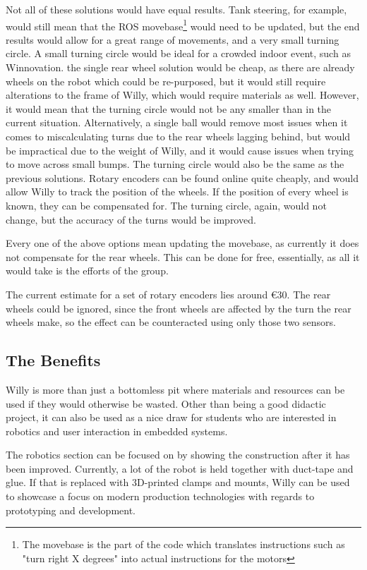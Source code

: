 Not all of these solutions would have equal results.
Tank steering, for example, would still mean that the ROS movebase\footnote{The movebase is the part of the code which translates instructions such as "turn right X degrees" into actual instructions for the motors} would need to be updated, but the end results would allow for a great range of movements, and a very small turning circle.
A small turning circle would be ideal for a crowded indoor event, such as Winnovation.
the single rear wheel solution would be cheap, as there are already wheels on the robot which could be re-purposed, but it would still require alterations to the frame of Willy, which would require materials as well.
However, it would mean that the turning circle would not be any smaller than in the current situation.
Alternatively, a single ball would remove most issues when it comes to miscalculating turns due to the rear wheels lagging behind, but would be impractical due to the weight of Willy, and it would cause issues when trying to move across small bumps.
The turning circle would also be the same as the previous solutions.
Rotary encoders can be found online quite cheaply, and would allow Willy to track the position of the wheels.
If the position of every wheel is known, they can be compensated for.
The turning circle, again, would not change, but the accuracy of the turns would be improved.

Every one of the above options mean updating the movebase, as currently it does not compensate for the rear wheels.
This can be done for free, essentially, as all it would take is the efforts of the group.

The current estimate for a set of rotary encoders lies around \euro 30.
The rear wheels could be ignored, since the front wheels are affected by the turn the rear wheels make, so the effect can be counteracted using only those two sensors.
\clearpage
\subsection{The Benefits}
Willy is more than just a bottomless pit where materials and resources can be used if they would otherwise be wasted.
Other than being a good didactic project, it can also be used as a nice draw for students who are interested in robotics and user interaction in embedded systems.

The robotics section can be focused on by showing the construction after it has been improved.
Currently, a lot of the robot is held together with duct-tape and glue.
If that is replaced with 3D-printed clamps and mounts, Willy can be used to showcase a focus on modern production technologies with regards to prototyping and development.

